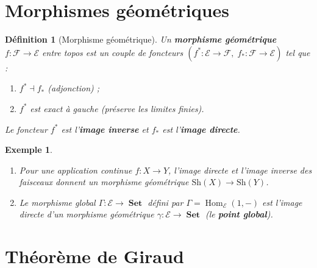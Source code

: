 \documentclass[a4paper,12pt]{book}
\DeclareMathOperator{\Hom}{Hom}
\DeclareMathOperator{\Set}{\mathbf{Set}}
\newtheorem{definition}[theoreme]{Définition}
\newtheorem{exemple}[theoreme]{Exemple}
\begin{document}
\section{Morphismes géométriques}\label{sec:morphismes-geometriques}

\begin{definition}[Morphisme géométrique]\label{def:morphisme-geometrique}
Un \textbf{morphisme géométrique} $f \colon \mathcal{F} \to \mathcal{E}$
entre topos est un couple de foncteurs
$(f^* \colon \mathcal{E} \to \mathcal{F},\;
  f_* \colon \mathcal{F} \to \mathcal{E})$
tel que :
\begin{enumerate}[label=(\roman*)]
\item $f^* \dashv f_*$ (adjonction) ;
\item $f^*$ est exact à gauche (préserve les limites finies).
\end{enumerate}
Le foncteur $f^*$ est l'\textbf{image inverse} et $f_*$ est
l'\textbf{image directe}.
\end{definition}

\begin{exemple}\label{ex:morphismes-geo}
\begin{enumerate}[label=(\roman*)]
\item Pour une application continue $f \colon X \to Y$,
      l'image directe et l'image inverse des faisceaux donnent
      un morphisme géométrique $\mathrm{Sh}(X) \to \mathrm{Sh}(Y)$.
\item Le morphisme global $\Gamma \colon \mathcal{E} \to \Set$
      défini par $\Gamma = \Hom_\mathcal{E}(1, -)$ est l'image
      directe d'un morphisme géométrique
      $\gamma \colon \mathcal{E} \to \Set$
      (le \textbf{point global}).
\end{enumerate}
\end{exemple}

\section{Théorème de Giraud}\label{sec:giraud}
\end{document}
